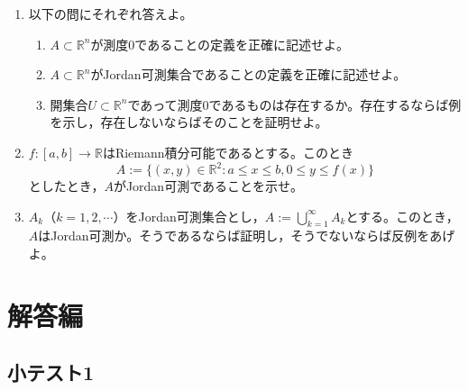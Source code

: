 \documentclass[dvipdfmx,a4j,10pt]{jsarticle}
\theoremstyle{mystyle1}
\theoremstyle{mystyle2}
\begin{document}
\begin{enumerate}
    \item 以下の問にそれぞれ答えよ。
        \begin{enumerate}\renewcommand{\labelenumii}{(\arabic{enumii})}
            \item $A\subset\mathbb{R}^n$が測度0であることの定義を正確に記述せよ。
            \item $A\subset\mathbb{R}^n$がJordan可測集合であることの定義を正確に記述せよ。
            \item 開集合$U\subset\mathbb{R}^n$であって測度0であるものは存在するか。存在するならば例を示し，存在しないならばそのことを証明せよ。
        \end{enumerate}
    \item $f:[a,b]\to\mathbb{R}$はRiemann積分可能であるとする。このとき
    \[
        A:=\{(x,y)\in\mathbb{R}^2:a\leq x\leq b,0\leq y\leq f(x)\}
    \]
    としたとき，$A$がJordan可測であることを示せ。
    \item $A_k$（$k=1,2,\cdots$）をJordan可測集合とし，$\displaystyle A:=\bigcup_{k=1}^\infty A_k$とする。このとき，$A$はJordan可測か。そうであるならば証明し，そうでないならば反例をあげよ。
\end{enumerate}

\newpage

\section{解答編}

\subsection{小テスト1}
\end{document}

